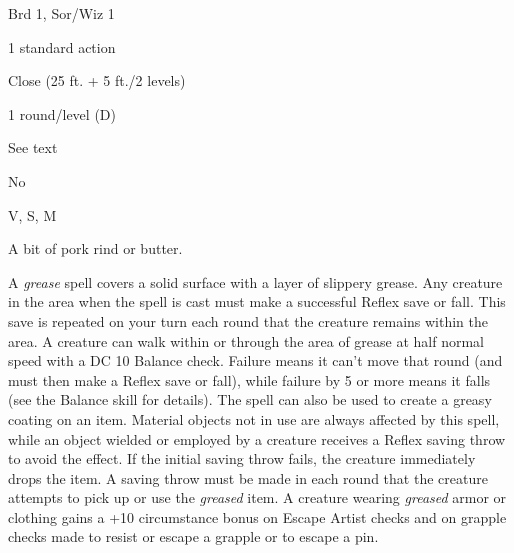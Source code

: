 
\begin{description*}
\item[Level:] Brd 1, Sor/Wiz 1
\item[Casting Time:] 1 standard action
\item[Range:] Close (25 ft. + 5 ft./2 levels)
\item[Duration:] 1 round/level (D)
\item[Saving Throw:] See text
\item[Spell Resistance:] No
\item[Components:] V, S, M
\item[Arcane Material Component:] A bit of pork rind or butter.
\end{description*}

A \textit{grease} spell covers a solid surface with a layer of slippery grease.
Any creature in the area when the spell is cast must make a successful Reflex save
or fall. This save is repeated on your turn each round that the creature remains
within the area. A creature can walk within or through the area of grease at half
normal speed with a DC 10 Balance check. Failure means it can't move that round
(and must then make a Reflex save or fall), while failure by 5 or more means it
falls (see the Balance skill for details).
The spell can also be used to create a greasy coating on an item. Material objects
not in use are always affected by this spell, while an object wielded or employed
by a creature receives a Reflex saving throw to avoid the effect. If the initial
saving throw fails, the creature immediately drops the item. A saving throw must
be made in each round that the creature attempts to pick up or use the \textit{greased
}item. A creature wearing \textit{greased} armor or clothing gains a +10 circumstance
bonus on Escape Artist checks and on grapple checks made to resist or escape a
grapple or to escape a pin.